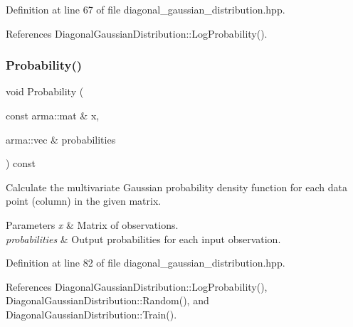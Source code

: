 Definition at line 67 of file diagonal\+\_\+gaussian\+\_\+distribution.\+hpp.



References Diagonal\+Gaussian\+Distribution\+::\+Log\+Probability().

\mbox{\label{classmlpack_1_1distribution_1_1DiagonalGaussianDistribution_a1e516aca34e9c99caf1431a822d87fc6}} 
\subsubsection{Probability()\hspace{0.1cm}{\footnotesize\ttfamily [2/2]}}
{\footnotesize\ttfamily void Probability (\begin{DoxyParamCaption}\item[{const arma\+::mat \&}]{x,  }\item[{arma\+::vec \&}]{probabilities }\end{DoxyParamCaption}) const\hspace{0.3cm}{\ttfamily [inline]}}



Calculate the multivariate Gaussian probability density function for each data point (column) in the given matrix. 


\begin{DoxyParams}{Parameters}
{\em x} & Matrix of observations. \\
\hline
{\em probabilities} & Output probabilities for each input observation. \\
\hline
\end{DoxyParams}


Definition at line 82 of file diagonal\+\_\+gaussian\+\_\+distribution.\+hpp.



References Diagonal\+Gaussian\+Distribution\+::\+Log\+Probability(), Diagonal\+Gaussian\+Distribution\+::\+Random(), and Diagonal\+Gaussian\+Distribution\+::\+Train().

\mbox{\label{classmlpack_1_1distribution_1_1DiagonalGaussianDistribution_a2c6f8d5bb4eacf7de767d2172b320756}} 
